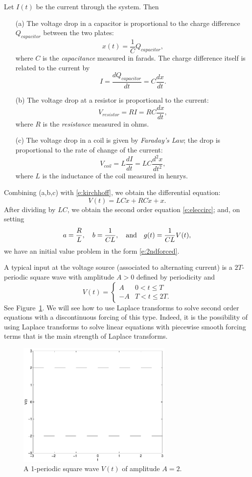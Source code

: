 \documentclass{ximera}
\begin{document}
Let $I(t)$ be the current through the system.  Then 
\begin{itemize}
\item[(a)]  The voltage drop in a capacitor is proportional to the charge 
difference $Q_{capacitor}$ between the two plates:
\[
x(t) = \frac{1}{C}Q_{capacitor},
\]
where $C$ is the {\em capacitance\/} measured in farads.  The charge 
difference itself is related to the current by 
\[
I = \frac{dQ_{capacitor}}{dt} = C\frac{dx}{dt}.
\]
\item[(b)]  The voltage drop at a resistor is proportional to the current:	
\[
V_{resistor} = RI = RC\frac{dx}{dt},
\]
where $R$ is the {\em resistance\/} measured in ohms.
\item[(c)]  The voltage drop in a coil is given by 
{\em Faraday's Law}; 
the drop is proportional to the rate of change of the current:
\[
V_{coil} = L\frac{dI}{dt} = LC\frac{d^2x}{dt^2},
\]
where $L$ is the inductance of the coil measured in henrys.
\end{itemize}

Combining (a,b,c) with \eqref{e:kirchhoff}, we obtain the differential equation:
\[
V(t) = LC\ddot{x} + RC\dot{x} +  x.
\]
After dividing by $LC$, we obtain the second order equation \eqref{e:eleccirc};
and, on setting 
\[
a = \frac{R}{L}, \quad b = \frac{1}{CL}, \quad\mbox{and}\quad g(t) = \frac{1}{CL}V(t),
\] 
we have an initial value problem in the form \eqref{e:2ndforced}.

A typical input at the voltage source 
(associated to alternating current) is 
a $2T$-periodic square wave with amplitude $A>0$ defined by periodicity and
\[
V(t) = \left\{\begin{array}{rl} A & 0<t\leq T\\
			       -A & T<t\leq 2T.
	\end{array}\right.
\]
See Figure~\ref{fig:sq}.  We will see how to use Laplace transforms to solve 
second order equations with a discontinuous forcing 
of this type.  Indeed,
it is the possibility of using Laplace transforms to solve linear equations 
with piecewise smooth forcing terms that is 
the main strength of Laplace
transforms.

\begin{figure}[htb]
           \centerline{%
           \includegraphics[width=3.0in]{../figures/sq.pdf}}
           \caption{A 1-periodic square wave $V(t)$ of amplitude $A=2$.}
           \label{fig:sq}
\end{figure}
\end{document}
